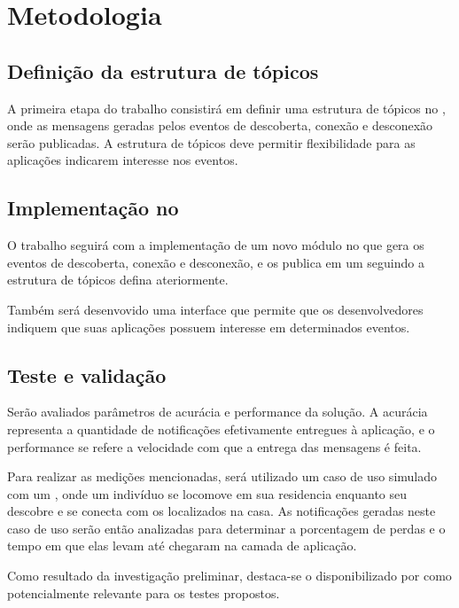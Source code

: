\chapter{Metodologia} \label{chap:metodologia}

\section{Definição da estrutura de tópicos \mqtt{}}

A primeira etapa do trabalho consistirá em definir uma estrutura de tópicos no \broker{} \mqtt{}, onde as mensagens geradas pelos eventos de descoberta, conexão e desconexão serão publicadas. A estrutura de tópicos deve permitir flexibilidade para as aplicações indicarem interesse nos eventos.

\section{Implementação no \middleware{} \mhubcddl{}}

O trabalho seguirá com a implementação de um novo módulo no \mhubcddl{} que gera os eventos de descoberta, conexão e desconexão, e os publica em um \broker{} \mqtt{} seguindo a estrutura de tópicos defina ateriormente.

Também será desenvovido uma interface que permite que os desenvolvedores indiquem que suas aplicações possuem interesse em determinados eventos.

\section{Teste e validação}

Serão avaliados parâmetros de acurácia e performance da solução. A acurácia representa a quantidade de notificações efetivamente entregues à aplicação, e o performance se refere a velocidade com que a entrega das mensagens é feita.

Para realizar as medições mencionadas, será utilizado um caso de uso simulado com um \dataset{}, onde um indivíduo se locomove em sua residencia enquanto seu \smartphone{} descobre e se conecta com os \smartobjs{} localizados na casa. As notificações geradas neste caso de uso serão então analizadas para determinar a porcentagem de perdas e o tempo em que elas levam até chegaram na camada de aplicação.

Como resultado da investigação preliminar, destaca-se o \dataset{} disponibilizado por  como potencialmente relevante para os testes propostos.


